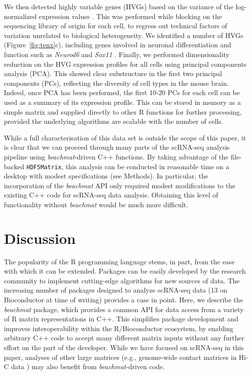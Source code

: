 \documentclass[10pt,letterpaper]{article}
\newcommand{\beachmat}{\textit{beachmat}}
\newcommand{\code}[1]{\texttt{#1}}
\begin{document}
We then detected highly variable genes (HVGs) based on the variance of the log-normalized expression values \cite{lun2016stepbystep}.
This was performed while blocking on the sequencing library of origin for each cell, to regress out technical factors of variation unrelated to biological heterogeneity.
We identified a number of HVGs (Figure~\ref{fig:tenx}c), including genes involved in neuronal differentiation and function such as \textit{Neurod6} \cite{ kay2011neurod6} and \textit{Sox11} \cite{bergsland2006establishment}. 
Finally, we performed dimensionality reduction on the HVG expression profiles for all cells using principal components analysis (PCA).
This showed clear substructure in the first two principal components (PCs), reflecting the diversity of cell types in the mouse brain.
Indeed, once PCA has been performed, the first 10-20 PCs for each cell can be used as a summary of its expression profile.
This can be stored in memory as a simple matrix and supplied directly to other R functions for further processing, provided the underlying algorithms are scalable with the number of cells.

While a full characterisation of this data set is outside the scope of this paper, it is clear that we can proceed through many parts of the scRNA-seq analysis pipeline using \beachmat{}-driven C++ functions.
By taking advantage of the file-backed \code{HDF5Matrix}, this analysis can be conducted in reasonable time on a desktop with modest specifications (see Methods).
In particular, the incorporation of the \beachmat{} API only required modest modifications to the existing C++ code for scRNA-seq data analysis.
Obtaining this level of functionality without \beachmat{} would be much more difficult.

\section*{Discussion}
The popularity of the R programming language stems, in part, from the ease with which it can be extended.
Packages can be easily developed by the research community to implement cutting-edge algorithms for new sources of data.
The increasing number of packages designed to analyze scRNA-seq data (13 on Bioconductor at time of writing) provides a case in point.
Here, we describe the \beachmat{} package, which provides a common API for data access from a variety of R matrix representations in C++.
This simplifies package development and improves interoperability within the R/Bioconductor ecosystem, by enabling arbitrary C++ code to accept many different matrix inputs without any further effort on the part of the developer.
While we have focused on scRNA-seq in this paper, analyses of other large matrices (e.g., genome-wide contact matrices in Hi-C data \cite{lun2016infrastructure}) may also benefit from \beachmat{}-driven code.
\end{document}
